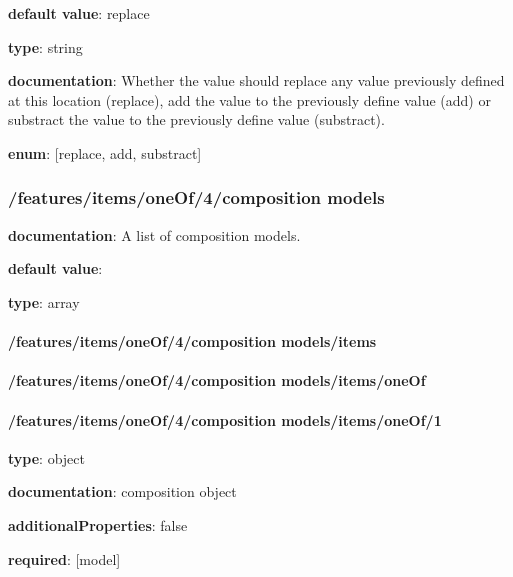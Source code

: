 \begin{itemized}
\item {\bf default value}: replace
\item {\bf type}: string
\item {\bf documentation}: Whether the value should replace any value previously defined at this location (replace), add the value to the previously define value (add) or substract the value to the previously define value (substract).
\item {\bf enum}: [replace, add, substract]\end{itemized}\subsubsection{/features/items/oneOf/4/composition models} \begin{itemized}
\item {\bf documentation}: A list of composition models.
\item {\bf default value}: 
\item {\bf type}: array
\paragraph{/features/items/oneOf/4/composition models/items} \begin{itemized}
\end{itemized}\end{itemized}\paragraph{/features/items/oneOf/4/composition models/items/oneOf} \begin{itemized}
\end{itemized}\paragraph{/features/items/oneOf/4/composition models/items/oneOf/1} \begin{itemized}
\item {\bf type}: object
\item {\bf documentation}: composition object
\item {\bf additionalProperties}: false
\item {\bf required}: [model]\end{itemized}
